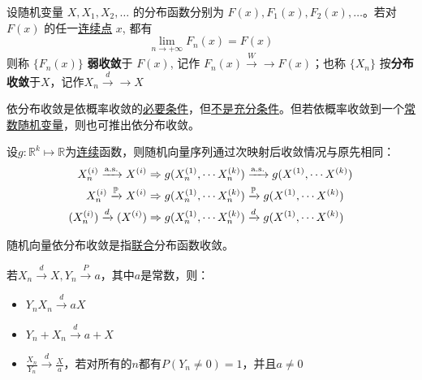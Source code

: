 \begin{definition}
    设随机变量 $ X, X_1,  X_2, \dotsc $  的分布函数分别为 $ F (x), F_1 (x), F_2 (x), \dotsc $。若对 $ F (x) $ 的任一\underline{连续点} $x$, 都有
    \[ \lim_{n \to +\infty} F_n (x) = F (x) \]
    则称 $ \{ F_n (x) \} $ \textbf{弱收敛}于 $ F (x) $, 记作    $F_n (x) \xrightarrow{W}{\to} F (x)$；也称 $ \{ X_n \} $ 按\textbf{分布收敛}于$X$，记作$X_n \xrightarrow{d}{\to} X$
\end{definition}

\begin{proposition}
    依分布收敛是依概率收敛的\underline{必要条件}，但\underline{不是充分条件}。但若依概率收敛到一个\underline{常数随机变量}，则也可推出依分布收敛。
\end{proposition}

\begin{theorem}[连续映射定理]
    设$g: \mathbb{R}^k \mapsto \mathbb{R}$为\underline{连续}函数，则随机向量序列通过次映射后收敛情况与原先相同：
    \begin{align*}
        X_n^{(i)} \xrightarrow{\mathrm{a.s.}} X^{(i)} &\Rightarrow g(X_n^{(1)},\cdots X_n^{(k)}) \xrightarrow{\mathrm{a.s.}} g(X^{(1)},\cdots X^{(k)})\\
        X_n^{(i)} \xrightarrow{\mathbb{P}} X^{(i)} &\Rightarrow g(X_n^{(1)},\cdots X_n^{(k)}) \xrightarrow{\mathbb{P}} g(X^{(1)},\cdots X^{(k)})\\
        (X_n^{(i)}) \xrightarrow{d} (X^{(i)}) &\Rightarrow g(X_n^{(1)},\cdots X_n^{(k)}) \xrightarrow{d} g(X^{(1)},\cdots X^{(k)})\\
    \end{align*}
\end{theorem}
\begin{remark}
    随机向量依分布收敛是指\underline{联合}分布函数收敛。
\end{remark}

\begin{theorem}[Slutsky定理]\label{thm:Slutsky}
    若$X_n \xrightarrow{d} X, Y_n \xrightarrow{P} a$，其中$a$是常数，则：
    \begin{itemize}
        \item $Y_n X_n \xrightarrow{d} a X$
        \item $Y_n + X_n \xrightarrow{d} a + X$
        \item $\frac{X_n}{Y_n}  \xrightarrow{d} \frac{X}{a}$，若对所有的$n$都有$P(Y_n\neq 0)=1$，并且$a\neq 0$
    \end{itemize}
\end{theorem}

